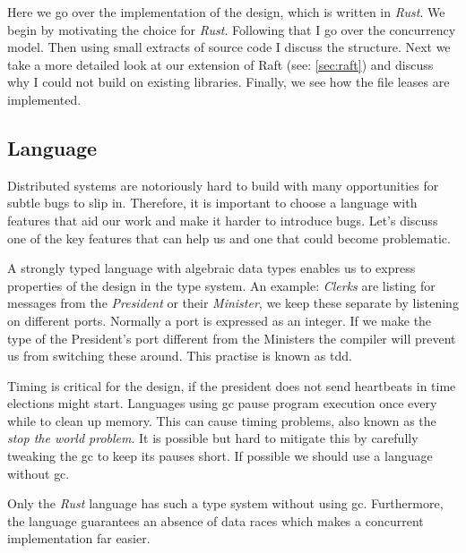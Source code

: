 Here we go over the implementation of the design, which is written in \textit{Rust}. We begin by motivating the choice for \textit{Rust}. Following that I go over the concurrency model. Then using small extracts of source code I discuss the structure. Next we take a more detailed look at our extension of Raft (see: \cref{sec:raft}) and discuss why I could not build on existing libraries. Finally, we see how the file leases are implemented.

\subsection{Language}
Distributed systems are notoriously hard to build with many opportunities for subtle bugs to slip in. Therefore, it is important to choose a language with features that aid our work and make it harder to introduce bugs. Let's discuss one of the key features that can help us and one that could become problematic.

A strongly typed language with algebraic data types enables us to express properties of the design in the type system. An example: \textit{Clerks} are listing for messages from the \textit{President} or their \textit{Minister}, we keep these separate by listening on different ports. Normally a port is expressed as an integer. If we make the type of the President's port different from the Ministers the compiler will prevent us from switching these around. This practise is known as \ac{tdd}.

Timing is critical for the design, if the president does not send heartbeats in time elections might start. Languages using \ac{gc} pause program execution once every while to clean up memory. This can cause timing problems, also known as the \textit{stop the world problem}. It is possible but hard to mitigate this by carefully tweaking the \ac{gc} to keep its pauses short. If possible we should use a language without \ac{gc}.

Only the \textit{Rust} language has such a type system without using \ac{gc}. Furthermore, the language guarantees an absence of data races which makes a concurrent implementation far easier.


